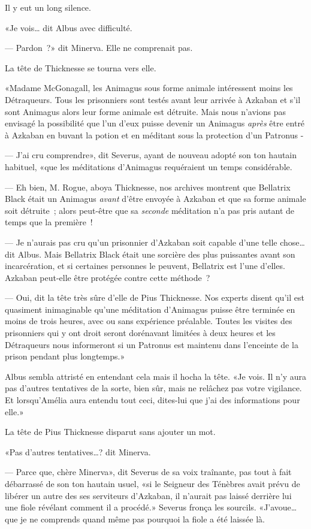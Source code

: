Il y eut un long silence.

«Je vois… dit Albus avec difficulté.

--- Pardon~?» dit Minerva. Elle ne comprenait pas.

La tête de Thicknesse se tourna vers elle.

«Madame McGonagall, les Animagus sous forme animale intéressent moins les Détraqueurs. Tous les prisonniers sont testés avant leur arrivée à Azkaban et s'il sont Animagus alors leur forme animale est détruite. Mais nous n'avions pas envisagé la possibilité que l'un d'eux puisse devenir un Animagus \emph{après} être entré à Azkaban en buvant la potion et en méditant sous la protection d'un Patronus -

--- J'ai cru comprendre», dit Severus, ayant de nouveau adopté son ton hautain habituel, «que les méditations d'Animagus requéraient un temps considérable.

--- Eh bien, M. Rogue, aboya Thicknesse, nos archives montrent que Bellatrix Black était un Animagus \emph{avant} d'être envoyée à Azkaban et que sa forme animale soit détruite~; alors peut-être que sa \emph{seconde} méditation n'a pas pris autant de temps que la première~!

--- Je n'aurais pas cru qu'un prisonnier d'Azkaban soit capable d'une telle chose… dit Albus. Mais Bellatrix Black était une sorcière des plus puissantes avant son incarcération, et si certaines personnes le peuvent, Bellatrix est l'une d'elles. Azkaban peut-elle être protégée contre cette méthode~?

--- Oui, dit la tête très sûre d'elle de Pius Thicknesse. Nos experts disent qu'il est quasiment inimaginable qu'une méditation d'Animagus puisse être terminée en moins de trois heures, avec ou sans expérience préalable. Toutes les visites des prisonniers qui y ont droit seront dorénavant limitées à deux heures et les Détraqueurs nous informeront si un Patronus est maintenu dans l'enceinte de la prison pendant plus longtemps.»

Albus sembla attristé en entendant cela mais il hocha la tête. «Je vois. Il n'y aura pas d'autres tentatives de la sorte, bien sûr, mais ne relâchez pas votre vigilance. Et lorsqu'Amélia aura entendu tout ceci, dites-lui que j'ai des informations pour elle.»

La tête de Pius Thicknesse disparut sans ajouter un mot.

«Pas d'autres tentatives…? dit Minerva.

--- Parce que, chère Minerva», dit Severus de sa voix traînante, pas tout à fait débarrassé de son ton hautain usuel, «si le Seigneur des Ténèbres avait prévu de libérer un autre des ses serviteurs d'Azkaban, il n'aurait pas laissé derrière lui une fiole révélant comment il a procédé.» Severus fronça les sourcils. «J'avoue… que je ne comprends quand même pas pourquoi la fiole a été laissée là.

